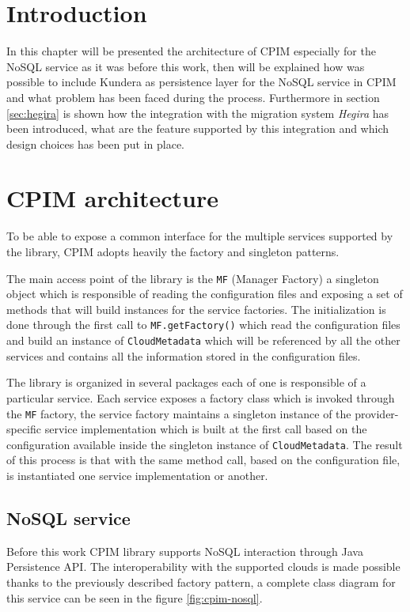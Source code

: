 \section{Introduction}
In this chapter will be presented the architecture of CPIM especially for the NoSQL service as it was before this work, then will be explained how was possible to include Kundera as persistence layer for the NoSQL service in CPIM and what problem has been faced during the process.
Furthermore in section \ref{sec:hegira} is shown how the integration with the migration system \textit{Hegira} has been introduced, what are the feature supported by this integration and which design choices has been put in place. 

\section{CPIM architecture}
To be able to expose a common interface for the multiple services supported by the library, CPIM adopts heavily the factory and singleton patterns.

\noindent The main access point of the library is the \texttt{MF} (Manager Factory) a singleton object which is responsible of reading the configuration files and exposing a set of methods that will build instances for the service factories.
The initialization is done through the first call to \texttt{MF.getFactory()} which read the configuration files and build an instance of \texttt{CloudMetadata} which will be referenced by all the other services and contains all the information stored in the configuration files.
 
\newparagraph The library is organized in several packages each of one is responsible of a particular service.
\noindent Each service exposes a factory class which is invoked through the \texttt{MF} factory, the service factory maintains a singleton instance of the provider-specific service implementation which is built at the first call based on the configuration available inside the singleton instance of \texttt{CloudMetadata}.
The result of this process is that with the same method call, based on the configuration file, is instantiated one service implementation or another.

\subsection{NoSQL service}
Before this work CPIM library supports NoSQL interaction through Java Persistence API.
The interoperability with the supported clouds is made possible thanks to the previously described factory pattern, a complete class diagram for this service can be seen in the figure \ref{fig:cpim-nosql}.

